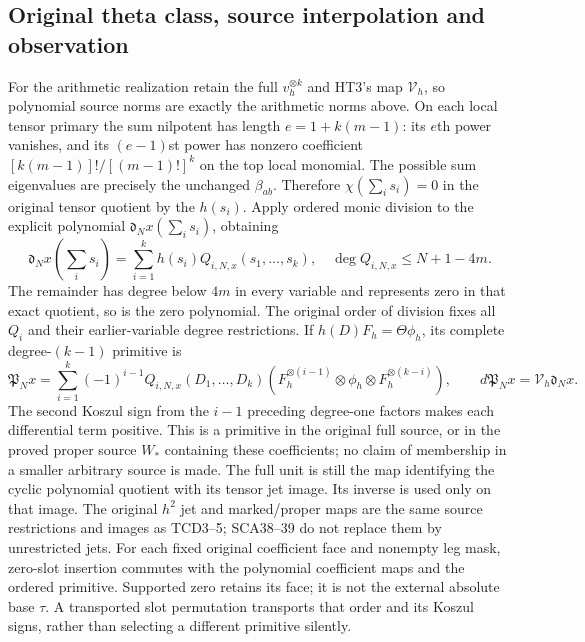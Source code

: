 \subsection{Original theta class, source interpolation and observation}

For the arithmetic realization retain the full $v_h^{\otimes k}$ and
HT3's map $\mathcal V_h$, so polynomial source norms are exactly the
arithmetic norms above. On each local tensor primary the sum nilpotent
has length $e=1+k(m-1)$: its $e$th power vanishes, and its $(e-1)$st
power has nonzero coefficient
$[k(m-1)]!/[(m-1)!]^k$ on the top local monomial. The possible sum
eigenvalues are precisely the unchanged $\beta_{ab}$. Therefore
$\chi(\sum_i s_i)=0$ in the original tensor quotient by the $h(s_i)$.
Apply ordered monic division to the explicit polynomial
$\mathfrak d_Nx(\sum_i s_i)$, obtaining
\[
 \mathfrak d_Nx(\textstyle\sum_i s_i)
       =\sum_{i=1}^k h(s_i)Q_{i,N,x}(s_1,\ldots,s_k),
 \quad \deg Q_{i,N,x}\le N+1-4m.
 \tag{SCA38}
\]
The remainder has degree below $4m$ in every variable and represents zero
in that exact quotient, so is the zero polynomial. The original order of
division fixes all $Q_i$ and their earlier-variable degree restrictions.
If $h(D)F_h=\Theta\phi_h$, its complete degree-$(k-1)$ primitive is
\[
 \mathfrak P_Nx=\sum_{i=1}^k(-1)^{i-1}Q_{i,N,x}(D_1,\ldots,D_k)
 (F_h^{\otimes(i-1)}\otimes\phi_h\otimes F_h^{\otimes(k-i)}),
 \qquad d\mathfrak P_Nx=\mathcal V_h\mathfrak d_Nx.
 \tag{SCA39}
\]
The second Koszul sign from the $i-1$ preceding degree-one factors makes
each differential term positive. This is a primitive in the original full
source, or in the proved proper source $W_*$ containing these coefficients;
no claim of membership in a smaller arbitrary source is made. The full
unit is still the map identifying the cyclic polynomial quotient with its
tensor jet image. Its inverse is used only on that image.
The original $h^2$ jet and marked/proper maps are the same source restrictions
and images as TCD3--5; SCA38--39 do not replace them by unrestricted jets.
For each fixed original coefficient face and nonempty leg mask, zero-slot
insertion commutes with the polynomial coefficient maps and the ordered
primitive. Supported zero retains its face; it is not the external absolute
base $\tau$. A transported slot permutation transports that order and its
Koszul signs, rather than selecting a different primitive silently.

